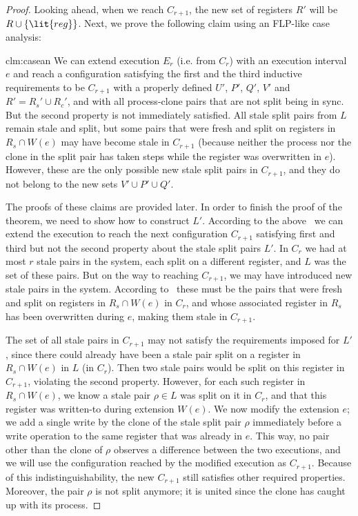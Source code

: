 \begin{proof}
Looking ahead, when we reach $C_{r+1}$, the new set of registers $R'$ will be $R \cup \{\lit{reg}\}$.
Next, we prove the following claim using an FLP-like case analysis:
\begin{repclaim}{clm:casean}
We can extend execution $E_r$ (i.e. from $C_r$) with an execution interval $e$ and reach a configuration 
  satisfying the first and the third inductive requirements to be $C_{r+1}$ 
  with a properly defined $U'$, $P'$, $Q'$, $V'$ and $R' = R_s' \cup R_c'$,
  and with all process-clone pairs that are not split being in sync.
But the second property is not immediately satisfied.
All stale split pairs from $L$ remain stale and split, but some pairs that were fresh and split on registers 
  in $R_s \cap W(e)$ may have become stale in $C_{r+1}$ 
  (because neither the process nor the clone in the split pair has taken steps while the register was overwritten in $e$). 
However, these are the only possible new stale split pairs in $C_{r+1}$, and they do not belong to the new sets $V' \cup P' \cup Q'$.
\end{repclaim}
The proofs of these claims are provided later. 
In order to finish the proof of the theorem, we need to show how to construct $L'$.
According to the above~ we can extend the execution to reach the next configuration $C_{r+1}$ 
  satisfying first and third but not the second property about the stale split pairs $L'$.
In $C_r$ we had at most $r$ stale pairs in the system, each split on a different register, and $L$ was the set of these pairs.
But on the way to reaching $C_{r+1}$, we may have introduced new stale pairs in the system.
According to~ these must be the pairs that were fresh and split on registers in $R_s \cap W(e)$ in $C_r$,
  and whose associated register in $R_s$ has been overwritten during $e$, making them stale in $C_{r+1}$.

The set of all stale pairs in $C_{r+1}$ may not satisfy the requirements imposed for $L'$,
  since there could already have been a stale pair split on a register in $R_s \cap W(e)$ in $L$ (in $C_r$).
Then two stale pairs would be split on this register in $C_{r+1}$, violating the second property.
However, for each such register in $R_s \cap W(e)$, 
  we know a stale pair $\rho \in L$ was split on it in $C_r$,
  and that this register was written-to during extension $W(e)$.
We now modify the extension $e$; we add a single write by the clone of the stale split pair $\rho$
  immediately before a write operation to the same register that was already in $e$.
This way, no pair other than the clone of $\rho$ observes a difference between the two executions, 
  and we will use the configuration reached by the modified execution as $C_{r+1}$.
Because of this indistinguishability, the new $C_{r+1}$ still satisfies other required properties.
Moreover, the pair $\rho$ is not split anymore; it is united since the clone has caught up with its process.


\end{proof}

